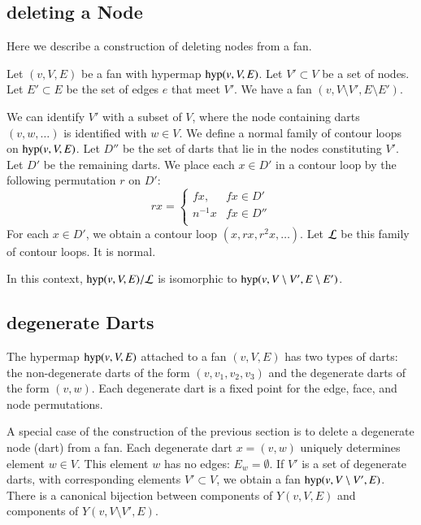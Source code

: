 \subsection{deleting a Node}


Here we describe a construction of deleting nodes from a 
fan.  


Let $(v,V,E)$ be a fan with hypermap ${\operatorname{hyp}}(v,V,E)$.
Let $V'\subset V$ be a set of nodes. 
Let $E'\subset E$ be the set of edges $e$ that meet $V'$.
We have a fan $(v,V\setminus V',E\setminus E')$.

We can identify $V'$ with a subset of $V$, where
the node containing darts $(v,w,\ldots)$ is identified with $w\in V$.
We define a normal family of contour loops on 
${\operatorname{hyp}}(v,V,E)$.  Let $D''$ be the set of darts that lie in the
nodes constituting $V'$.  Let $D'$ be the remaining darts.
We place each $x\in D'$ in a contour
loop by the following permutation $r$ on $D'$:
    $$r x =
    \begin{cases}
    f x, & f x \in D'\\
    n^{-1} x & f x \in D''\\
    \end{cases}
    $$
For each $x\in D'$, we obtain a contour loop $(x,r x, r^2 x,\ldots)$.
Let $\cal L$ be this family of contour loops.  It is normal.

\begin{lemma} In this context,
${\operatorname{hyp}}(v,V,E)/{\cal L}$ is isomorphic to 
${\operatorname{hyp}}(v,V\setminus V',E\setminus E')$.
\end{lemma}



\subsection{degenerate Darts}


The hypermap ${\operatorname{hyp}}(v,V,E)$ attached to a fan $(v,V,E)$
has two types of darts: the non-degenerate darts of the form
$(v,v_1,v_2,v_3)$ and the degenerate darts of the form $(v,w)$.
Each degenerate dart is a  fixed point for the edge, face, and node
permutations.

A special case of the construction of the previous section
is to delete a degenerate node (dart) from a fan.
Each degenerate dart $x=(v,w)$ uniquely determines element
$w\in V$.  This element $w$ has no edges: $E_w = \emptyset$.
If $V'$ is a set of degenerate darts, with corresponding elements
$V'\subset V$, 
we obtain a fan
${\operatorname{hyp}}(v,V\setminus V',E)$.  There is a canonical bijection
between components of $Y(v,V,E)$ and components of $Y(v,V\setminus V',E)$.

